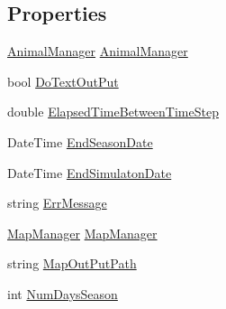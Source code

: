 \subsection*{Properties}
\begin{DoxyCompactItemize}
\item 
\hyperlink{class_s_e_a_r_c_h_1_1_animal_manager}{Animal\-Manager} \hyperlink{class_s_e_a_r_c_h_1_1_simulaton_manager_a973ada3841ee555105f7924b2686f1d4}{Animal\-Manager}
\item 
bool \hyperlink{class_s_e_a_r_c_h_1_1_simulaton_manager_af30500a864ff11f63588abdb37b2e088}{Do\-Text\-Out\-Put}
\item 
double \hyperlink{class_s_e_a_r_c_h_1_1_simulaton_manager_a4330d8b9acc4030ed87e68946c9c08e7}{Elapsed\-Time\-Between\-Time\-Step}
\item 
Date\-Time \hyperlink{class_s_e_a_r_c_h_1_1_simulaton_manager_ad2e4b697ea8f94a61ec5a1fc18b5d61e}{End\-Season\-Date}
\item 
Date\-Time \hyperlink{class_s_e_a_r_c_h_1_1_simulaton_manager_a32cb04f903957d18c0d69463584f5bca}{End\-Simulaton\-Date}
\item 
string \hyperlink{class_s_e_a_r_c_h_1_1_simulaton_manager_aaadb2a776a0a68224eea1fb757677cd5}{Err\-Message}
\item 
\hyperlink{class_s_e_a_r_c_h_1_1_map_manager}{Map\-Manager} \hyperlink{class_s_e_a_r_c_h_1_1_simulaton_manager_a74157972d3b6ef60e20edceddec3f1c4}{Map\-Manager}
\item 
string \hyperlink{class_s_e_a_r_c_h_1_1_simulaton_manager_a7f17624a62673a19589d21ba614e243a}{Map\-Out\-Put\-Path}
\item 
int \hyperlink{class_s_e_a_r_c_h_1_1_simulaton_manager_ae6d6a9635f0b3866305e128d3e531cb1}{Num\-Days\-Season}

\end{DoxyCompactItemize}
